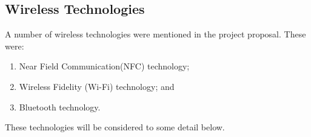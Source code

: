 \documentclass[12pt,svgnames,smaller]{article} %
\begin{document}
	\subsection{\textbf{Wireless Technologies}}
	
	A number of wireless technologies were mentioned in the project proposal. These were:
	
	\begin{enumerate}
		\item Near Field Communication(NFC) technology;
		\item Wireless Fidelity (Wi-Fi) technology; and
		\item Bluetooth technology. 
	\end{enumerate}
	
	These technologies will be considered to some detail below.
	
\end{document}
